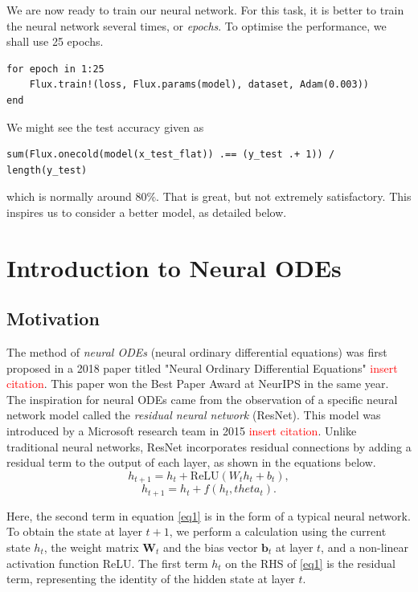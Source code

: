 \documentclass[a4paper,11pt,titlepage]{article}
\def\theta{theta}%
\theoremstyle{definition}
\theoremstyle{plain}
\theoremstyle{remark}
\begin{document}
We are now ready to train our neural network. For this task, it is better to train the neural network several times, or \textit{epochs}. To optimise the performance, we shall use 25 epochs.

\begin{verbatim}
for epoch in 1:25
    Flux.train!(loss, Flux.params(model), dataset, Adam(0.003))
end
\end{verbatim}

We might see the test accuracy given as

\begin{verbatim}
sum(Flux.onecold(model(x_test_flat)) .== (y_test .+ 1)) / length(y_test)
\end{verbatim}

which is normally around $80\%$. That is great, but not extremely satisfactory. This inspires us to consider a better model, as detailed below.

\pagebreak
\section{Introduction to Neural ODEs}

\subsection{Motivation}

The method of \textit{neural ODEs} (neural ordinary differential equations) was first proposed in a 2018 paper titled "Neural Ordinary Differential Equations" \textcolor{red}{insert citation}. This paper won the Best Paper Award at NeurIPS in the same year. The inspiration for neural ODEs came from the observation of a specific neural network model called the \textit{residual neural network} (ResNet). This model was introduced by a Microsoft research team in 2015 \textcolor{red}{insert citation}. Unlike traditional neural networks, ResNet incorporates residual connections by adding a residual term to the output of each layer, as shown in the equations below.
\begin{equation}\label{eq1}
    h_{t+1} = h_t + \mathrm{ReLU}\left(W_t h_t + b_t\right),\tag{1}
\end{equation}
\begin{equation}\label{eq2}
    h_{t+1} = h_t + f\left(h_t, \theta_t\right).\tag{2}
\end{equation}

Here, the second term in equation \ref{eq1} is in the form of a typical neural network. To obtain the state at layer $t+1$, we perform a calculation using the current state $h_t$, the weight matrix $\textbf{W}_t$ and the bias vector $\textbf{b}_t$ at layer $t$, and a non-linear activation function ReLU. The first term $h_t$ on the RHS of \ref{eq1} is the residual term, representing the identity of the hidden state at layer $t$.
\end{document}
